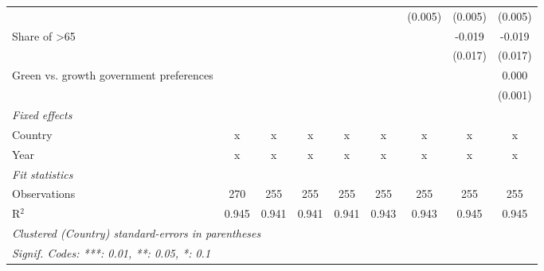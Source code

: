 \begin{table}[htbp]
\begin{tabular}{lcccccccc}
                                              &         &         &         &         &         & (0.005) & (0.005) & (0.005)\\   
      Share of >65                            &         &         &         &         &         &         & -0.019  & -0.019\\   
                                              &         &         &         &         &         &         & (0.017) & (0.017)\\   
      Green vs. growth government preferences &         &         &         &         &         &         &         & 0.000\\   
                                              &         &         &         &         &         &         &         & (0.001)\\   
      \emph{Fixed effects}\\
      Country                                 & x       & x       & x       & x       & x       & x       & x       & x\\  
      Year                                    & x       & x       & x       & x       & x       & x       & x       & x\\  
      \midrule \emph{Fit statistics}\\
      Observations                            & 270     & 255     & 255     & 255     & 255     & 255     & 255     & 255\\  
      R$^2$                                   & 0.945   & 0.941   & 0.941   & 0.941   & 0.943   & 0.943   & 0.945   & 0.945\\  
      \midrule
      \multicolumn{9}{l}{\emph{Clustered (Country) standard-errors in parentheses}}\\
      \multicolumn{9}{l}{\emph{Signif. Codes: ***: 0.01, **: 0.05, *: 0.1}}\\
   \end{tabular}
\end{table}


